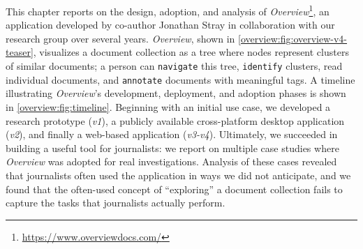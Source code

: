 
This chapter reports on the design, adoption, and analysis of {\it Overview}\footnote{\url{https://www.overviewdocs.com/}}, an application developed by co-author Jonathan Stray in collaboration with our research group over several years.
{\it Overview}, shown in \autoref{overview:fig:overview-v4-teaser}, visualizes a document collection as a tree where nodes represent clusters of similar documents; a person can {\tt navigate} this tree, {\tt identify} clusters, read individual documents, and {\tt annotate} documents with meaningful tags.
A timeline illustrating {\it Overview}'s development, deployment, and adoption phases is shown in \autoref{overview:fig:timeline}.
Beginning with an initial use case, we developed a research prototype ({\it v1}), a publicly available cross-platform desktop application ({\it v2}), and finally a web-based application ({\it v3-v4}).
Ultimately, we succeeded in building a useful tool for journalists:
we report on multiple case studies where {\it Overview} was adopted for real investigations. 
Analysis of these cases revealed that journalists often used the application in ways we did not anticipate, and we found that the often-used concept of ``exploring'' a document collection fails to capture the tasks that journalists actually perform.


